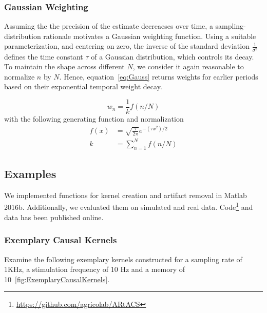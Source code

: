 \documentclass[a4paper]{article}
\begin{document}
\subsubsection{Gaussian Weighting}

Assuming the the precision of the estimate decreaeses over time, a sampling-distribution rationale motivates a Gaussian weighting function. Using a suitable parameterization, and centering on zero, the inverse of the standard deviation $\frac{1}{\sigma^2}$ defines the time constant $\tau$ of a Gaussian distribution, which controls its decay.
To maintain the shape across different $N$, we consider it again reasonable to normalize $n$ by $N$. Hence, equation~\eqref{eq:Gauss} returns weights for earlier periods based on their exponential temporal weight decay.

\begin{equation}
    w_n = \frac{1}{k} f(n/N)\label{eq:Gauss}
\end{equation}
with the following generating function and normalization
\begin{align}
    f(x)  & = \sqrt{\frac{\tau}{2\pi}} e^{-(\tau x^2)/2}  \\
    k  & = \sum_{n=1}^{N} f(n/N)\label{eq:NormGauss}
\end{align}

\subsection{Examples}

We implemented functions for kernel creation and artifact removal in Matlab 2016b. Additionally, we evaluated them  on simulated and real data. Code\footnote{\url{https://github.com/agricolab/ARtACS}} and data has been published online.

\subsubsection{Exemplary Causal Kernels}

Examine the following exemplary kernels constructed for a sampling rate of 1KHz, a stimulation frequency of 10 Hz and a memory of 10~\ref{fig:ExemplaryCausalKernels}.
\end{document}
